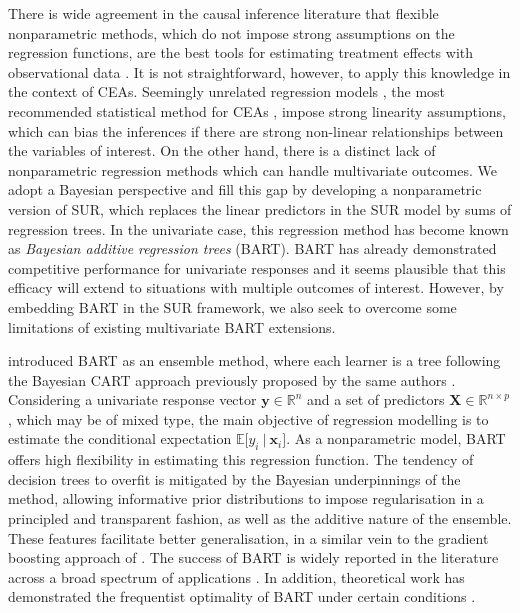 \documentclass[aoas,preprint]{imsart}
\newcommand\given[1][]{\:#1\vert\:}
\theoremstyle{plain}
\theoremstyle{definition}
\theoremstyle{remark}
\begin{document}
There is wide agreement in the causal inference literature that flexible nonparametric methods, which do not impose strong %
assumptions on the regression functions, are the best tools for estimating treatment effects with observational data \citep{dorie2019automated,rudolph2023all}. It is not straightforward, however, to apply this knowledge in the context of CEAs. Seemingly unrelated regression  models \citep[SUR;][]{zellner1962efficient}, the most recommended statistical method for CEAs \citep{willan2004regression,el2022scoping}, impose strong linearity assumptions, which can bias the inferences if there are strong non-linear relationships between the variables of interest. On the other hand, there is a distinct lack of nonparametric regression methods which can handle multivariate outcomes. We adopt a Bayesian perspective and fill this gap by developing a nonparametric version of SUR, which replaces the linear predictors in the SUR model by sums of regression trees. In the univariate case, this regression method has become known as \textit{Bayesian additive regression trees} (BART). BART has already demonstrated competitive performance for univariate responses \citep{dorie2019automated,rudolph2023all} and it seems plausible that this efficacy will extend to situations with multiple outcomes of interest. However, by embedding BART in the SUR framework, we also seek to overcome some limitations of existing multivariate BART extensions.

\citet{chipman2010bart} introduced BART as an ensemble method, where each learner is a tree following the Bayesian CART approach previously proposed by the same authors \citep{chipman1998bayesian}. Considering a univariate response vector $\mathbf{y} \in \mathbb{R}^{n}$ and a set of predictors $\mathbf{X} \in \mathbb{R}^{n\times p}$, which may be of mixed type, the main objective of regression modelling is to estimate the conditional expectation $\mathbb{E}\lbrack y_i\given \mathbf{x}_i\rbrack$. As a nonparametric model, BART offers high flexibility in estimating this regression function. The tendency of decision trees to overfit is mitigated by the Bayesian underpinnings of the method, allowing informative prior distributions to impose regularisation in a principled and transparent fashion, as well as the additive nature of the ensemble. These features facilitate better generalisation, in a similar vein to the gradient boosting approach of \citet{friedman2001greedy}. The success of BART is widely reported in the literature across a broad spectrum of applications \citep{janizadeh2021novel,sarti2023bayesian,yee2024evaluating}. In addition, theoretical work has demonstrated the frequentist optimality of BART under certain conditions \citep{linero2018bayesian,rockova2020semi,rockova2020posterior}.
\end{document}
